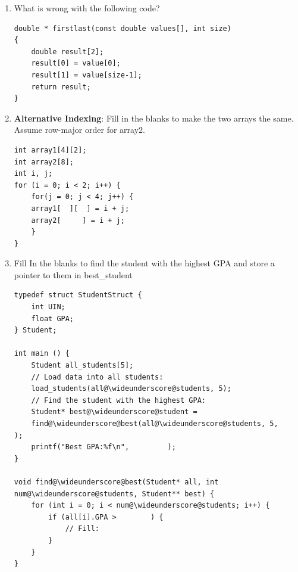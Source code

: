 \documentclass{article}
\begin{document}
\begin{enumerate}[label=(\alph*), itemsep = 120pt]
\begin{lstlisting}[style=CStyle] 
void ReverseArray(int array[], int size) {
    int start = 0;
    int end = size - 1;
    int temp;
    
    if (start < end) {
        // Swap First and Last
        temp = array[start];
        array[start] = array[end];
        array[end] = temp;
        
        ReverseArray(array, size-1);
    }
}
int main(){
    int array[5], i;
    for (i = 0; i<5; i++){
        array[i] = i;
    }
    ReverseArray(array, 5);
    printf("Reversed Array: ");

    for (i = 0; i<5; i++){
        printf("%d ", array[i]);
    }
    printf("\n");
    return 0;
}\end{lstlisting}

\item \textbf{}What is wrong with the following code? 
\begin{lstlisting}[style=CStyle] 
double * firstlast(const double values[], int size)
{
    double result[2];
    result[0] = value[0];
    result[1] = value[size-1];
    return result;
}
\end{lstlisting}

\item \textbf{Alternative Indexing}: Fill in the blanks to make the two arrays the same. Assume row-major order for array2.
\begin{lstlisting}[style=CStyle] 
int array1[4][2];
int array2[8];
int i, j;
for (i = 0; i < 2; i++) {
    for(j = 0; j < 4; j++) {
    array1[  ][  ] = i + j;
    array2[     ] = i + j;
    }
}
\end{lstlisting}

\item Fill In the blanks to find the student with the highest GPA and store a pointer to them in best\_student
\begin{lstlisting}[style=CStyle] 
typedef struct StudentStruct {
    int UIN;
    float GPA;
} Student;

int main () {
    Student all_students[5];
    // Load data into all students:
    load_students(all@\wideunderscore@students, 5);
    // Find the student with the highest GPA:
    Student* best@\wideunderscore@student = 
    find@\wideunderscore@best(all@\wideunderscore@students, 5,         );
    printf("Best GPA:%f\n",         );
}

void find@\wideunderscore@best(Student* all, int num@\wideunderscore@students, Student** best) {
    for (int i = 0; i < num@\wideunderscore@students; i++) {
        if (all[i].GPA >        ) {
            // Fill:
        }
    }
}


\end{lstlisting}
\end{enumerate}
\end{document}
